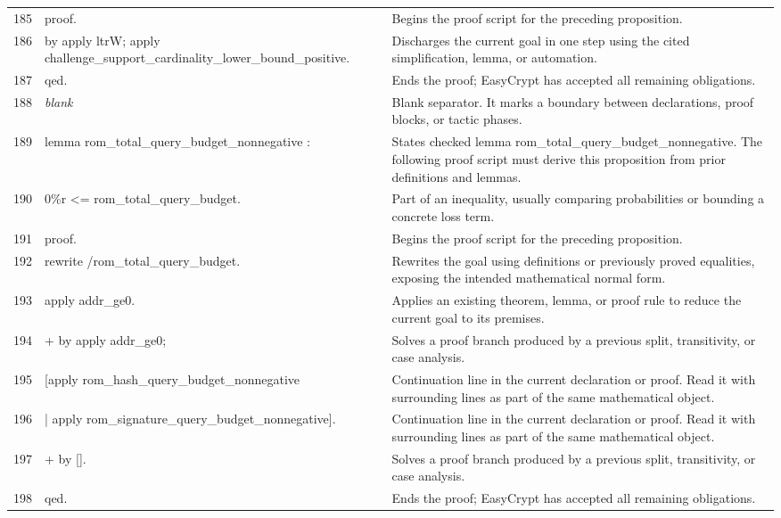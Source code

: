 \documentclass[10pt]{article}
\begin{document}
\begin{longtable}{r L{0.53\textwidth} L{0.37\textwidth}}
185 & {\ttfamily\scriptsize proof.} & Begins the proof script for the preceding proposition. \\
186 & {\ttfamily\scriptsize by apply ltrW; apply challenge\_support\_cardinality\_lower\_bound\_positive.} & Discharges the current goal in one step using the cited simplification, lemma, or automation. \\
187 & {\ttfamily\scriptsize qed.} & Ends the proof; EasyCrypt has accepted all remaining obligations. \\
188 & {\ttfamily\scriptsize \emph{blank}} & Blank separator.  It marks a boundary between declarations, proof blocks, or tactic phases. \\
189 & {\ttfamily\scriptsize lemma rom\_total\_query\_budget\_nonnegative :} & States checked lemma rom\_total\_query\_budget\_nonnegative.  The following proof script must derive this proposition from prior definitions and lemmas. \\
190 & {\ttfamily\scriptsize   0\%r <= rom\_total\_query\_budget.} & Part of an inequality, usually comparing probabilities or bounding a concrete loss term. \\
191 & {\ttfamily\scriptsize proof.} & Begins the proof script for the preceding proposition. \\
192 & {\ttfamily\scriptsize rewrite /rom\_total\_query\_budget.} & Rewrites the goal using definitions or previously proved equalities, exposing the intended mathematical normal form. \\
193 & {\ttfamily\scriptsize apply addr\_ge0.} & Applies an existing theorem, lemma, or proof rule to reduce the current goal to its premises. \\
194 & {\ttfamily\scriptsize + by apply addr\_ge0;} & Solves a proof branch produced by a previous split, transitivity, or case analysis. \\
195 & {\ttfamily\scriptsize      [apply rom\_hash\_query\_budget\_nonnegative} & Continuation line in the current declaration or proof.  Read it with surrounding lines as part of the same mathematical object. \\
196 & {\ttfamily\scriptsize      | apply rom\_signature\_query\_budget\_nonnegative].} & Continuation line in the current declaration or proof.  Read it with surrounding lines as part of the same mathematical object. \\
197 & {\ttfamily\scriptsize + by [].} & Solves a proof branch produced by a previous split, transitivity, or case analysis. \\
198 & {\ttfamily\scriptsize qed.} & Ends the proof; EasyCrypt has accepted all remaining obligations. \\

\end{longtable}
\end{document}
